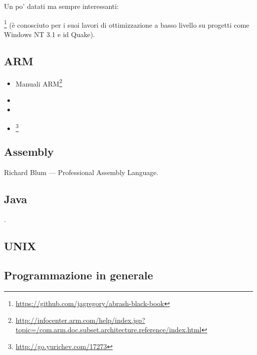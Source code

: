 Un po' datati ma sempre interessanti:

\MAbrash\footnote{\AlsoAvailableAs \url{https://github.com/jagregory/abrash-black-book}}
(è conosciuto per i suoi lavori di ottimizzazione a basso livello su progetti come Windows NT 3.1 e id Quake).

\subsection{ARM}

\begin{itemize}
\item Manuali ARM\footnote{\AlsoAvailableAs \url{http://infocenter.arm.com/help/index.jsp?topic=/com.arm.doc.subset.architecture.reference/index.html}}

\item \ARMSevenRef

\item \ARMSixFourRefURL

\item \ARMCookBook\footnote{\AlsoAvailableAs \url{http://go.yurichev.com/17273}}
\end{itemize}

\subsection{Assembly}

Richard Blum --- Professional Assembly Language.

\subsection{Java}

\JavaBook.

\subsection{UNIX}

\TAOUP

\subsection{Programmazione in generale}

